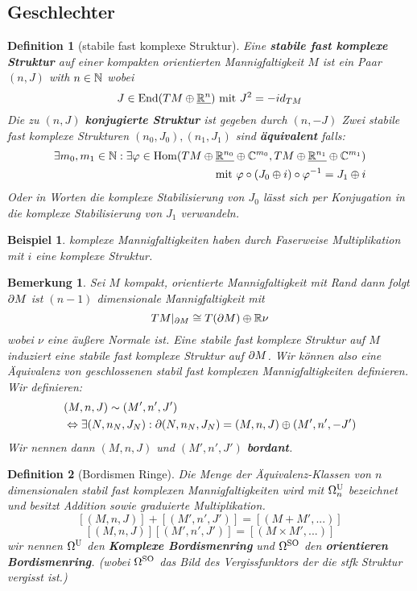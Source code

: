 \documentclass{report}
\newtheorem{Def}{Definition}[chapter]
\newtheorem*{Bem}{Bemerkung}
\newtheorem*{Ex}{Beispiel}
\begin{document}
\subsection*{Geschlechter}
\begin{Def}[stabile fast komplexe Struktur]
   Eine \textbf{stabile fast komplexe Struktur} auf einer kompakten orientierten Mannigfaltigkeit $M$ ist ein Paar $(n, J)$ with $n \in \mathbb{N}$ wobei
   $$ J \in \operatorname{End}(TM \oplus \underline{\mathbb{R}^n}) \text{ mit } J^2 = - id_{TM}$$
   Die zu $(n,J)$ \textbf{konjugierte Struktur} ist gegeben durch $(n,-J)$
   Zwei stabile fast komplexe Strukturen $(n_0,J_0),(n_1,J_1)$ sind \textbf{äquivalent} falls:
   \begin{align*}
    \exists m_0,m_1 \in \mathbb{N}: \exists \varphi \in \operatorname{Hom}(TM \oplus \underline{\mathbb{R}^{n_0}} \oplus \mathbb{C}^{m_0},TM\oplus\underline{\mathbb{R}^{n_1}}\oplus\mathbb{C}^{m_1})\\
    \text{ mit  } \varphi \circ (J_0 \oplus i) \circ \varphi^{-1} = J_1 \oplus i 
\end{align*}
Oder in Worten die komplexe Stabilisierung von $J_0$ lässt sich per Konjugation in die komplexe Stabilisierung von $J_1$ verwandeln.
\end{Def}
\begin{Ex}
    komplexe Mannigfaltigkeiten haben durch Faserweise Multiplikation mit $i$ eine komplexe Struktur.
\end{Ex}

\begin{Bem}
    Sei $M$ kompakt, orientierte Mannigfaltigkeit mit Rand dann folgt $\partial M$ ist $(n-1)$ dimensionale Mannigfaltigkeit mit
    $$TM|_{\partial M} \cong T(\partial M) \oplus \mathbb{R}\nu$$ wobei $\nu$ eine äußere Normale ist.
    Eine stabile fast komplexe Struktur auf $M$ induziert eine stabile fast komplexe Struktur auf $\partial M$.
    Wir können also eine Äquivalenz von geschlossenen stabil fast komplexen Mannigfaltigkeiten definieren.
    Wir definieren:
    \begin{align*}
        &(M,n,J) \sim (M',n',J')\\
        & \Leftrightarrow \exists (N,n_N,J_N): \partial (N,n_N,J_N) = (M,n,J) \oplus (M',n',-J')
    \end{align*}
    Wir nennen dann $(M,n,J)$ und $(M',n',J')$ \textbf{bordant}.
\end{Bem}

\begin{Def}[Bordismen Ringe]
    Die Menge der Äquivalenz-Klassen von $n$ dimensionalen stabil fast komplexen Mannigfaltigkeiten 
    wird mit $\Omega^{\mathrm{U}}_n$ bezeichnet und besitzt Addition sowie graduierte Multiplikation.
    $$[(M,n,J)] + [(M',n',J')] = [(M + M',...)]$$
    $$[(M,n,J)][(M',n',J')] = [(M \times M', ...)]$$
    wir nennen $\Omega^{\mathrm{U}}$ den \textbf{Komplexe Bordismenring} und $\Omega^{\mathrm{SO}}$ den \textbf{orientieren Bordismenring}.
    (wobei $\Omega^{\mathrm{SO}}$ das Bild des Vergissfunktors der die stfk Struktur vergisst ist.) 
\end{Def}
\end{document}
